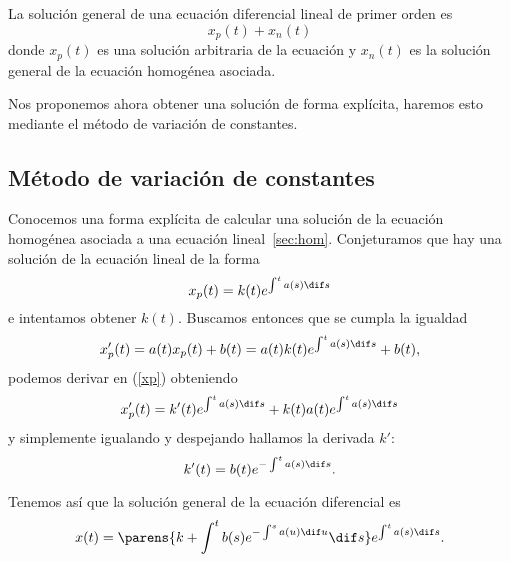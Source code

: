 \documentclass[../main.tex]{subfiles}
\begin{document}
\begin{corollary}
	La solución general de una ecuación diferencial lineal de primer orden es
	\[x_p(t) + x_n(t)\]
	donde \(x_p(t)\) es una solución arbitraria de la ecuación y \(x_n(t)\) es
	la solución general de la ecuación homogénea asociada.
\end{corollary}

Nos proponemos ahora obtener una solución de forma explícita, haremos esto
mediante el método de variación de constantes.

\subsection{Método de variación de constantes}

Conocemos una forma explícita de calcular una solución de la ecuación homogénea
asociada a una ecuación lineal~\autoref{sec:hom}. Conjeturamos que hay una
solución de la ecuación lineal de la forma
\begin{equation}\label{xp}
  x_p(t) = k(t) e^{\int^t a(s) \dif s}
\end{equation}
e intentamos obtener \(k(t)\). Buscamos entonces que se cumpla la igualdad
\[x'_p(t) = a(t)x_p(t) + b(t) = a(t)k(t) e^{\int^t a(s) \dif s} + b(t),\]
podemos derivar en (\ref{xp}) obteniendo
\[x'_p(t) = k'(t) e^{\int^t a(s) \dif s} + k(t)a(t) e^{\int^t a(s) \dif s}\]
y simplemente igualando y despejando hallamos la derivada \(k'\):
\[k'(t) = b(t)e^{-\int^t a(s) \dif s}.\]

Tenemos así que la solución general de la ecuación diferencial es
\[x(t) = \parens{k + \int^t b(s) e^{-\int^s a(u) \dif u} \dif s}
	e^{\int^t a(s) \dif s}.\]
\end{document}
